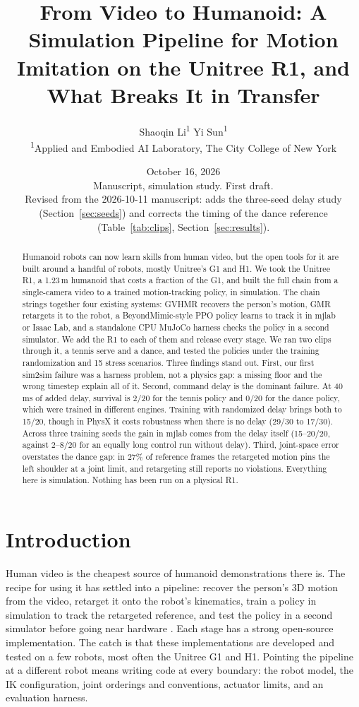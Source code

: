 \documentclass[11pt]{article}
\title{From Video to Humanoid: A Simulation Pipeline for Motion\\ Imitation on the Unitree R1, and What Breaks It in Transfer}
\author{Shaoqin Li\textsuperscript{1} \quad Yi Sun\textsuperscript{1}\\[0.3em]
{\small \textsuperscript{1}Applied and Embodied AI Laboratory, The City College of New York}}
\date{October 16, 2026\\[0.2em]\small Manuscript, simulation study. First draft.\\[0.2em]
\small Revised from the 2026-10-11 manuscript: adds the three-seed delay study (Section~\ref{sec:seeds}) and corrects the timing of the dance reference (Table~\ref{tab:clips}, Section~\ref{sec:results}).}
\begin{document}
\maketitle

\begin{abstract}
Humanoid robots can now learn skills from human video, but the open tools for it are built around a handful of robots, mostly Unitree's G1 and H1. We took the Unitree R1, a 1.23\,m humanoid that costs a fraction of the G1, and built the full chain from a single-camera video to a trained motion-tracking policy, in simulation. The chain strings together four existing systems: GVHMR recovers the person's motion, GMR retargets it to the robot, a BeyondMimic-style PPO policy learns to track it in mjlab or Isaac Lab, and a standalone CPU MuJoCo harness checks the policy in a second simulator. We add the R1 to each of them and release every stage. We ran two clips through it, a tennis serve and a dance, and tested the policies under the training randomization and 15 stress scenarios. Three findings stand out. First, our first sim2sim failure was a harness problem, not a physics gap: a missing floor and the wrong timestep explain all of it. Second, command delay is the dominant failure. At 40\,ms of added delay, survival is 2/20 for the tennis policy and 0/20 for the dance policy, which were trained in different engines. Training with randomized delay brings both to 15/20, though in PhysX it costs robustness when there is no delay (29/30 to 17/30). Across three training seeds the gain in mjlab comes from the delay itself (15--20/20, against 2--8/20 for an equally long control run without delay). Third, joint-space error overstates the dance gap: in 27\% of reference frames the retargeted motion pins the left shoulder at a joint limit, and retargeting still reports no violations. Everything here is simulation. Nothing has been run on a physical R1.
\end{abstract}

\section{Introduction}
Human video is the cheapest source of humanoid demonstrations there is. The recipe for using it has settled into a pipeline: recover the person's 3D motion from the video, retarget it onto the robot's kinematics, train a policy in simulation to track the retargeted reference, and test the policy in a second simulator before going near hardware \cite{videomimic,h2o,asap,beyondmimic}. Each stage has a strong open-source implementation. The catch is that these implementations are developed and tested on a few robots, most often the Unitree G1 and H1. Pointing the pipeline at a different robot means writing code at every boundary: the robot model, the IK configuration, joint orderings and conventions, actuator limits, and an evaluation harness.
\end{document}
